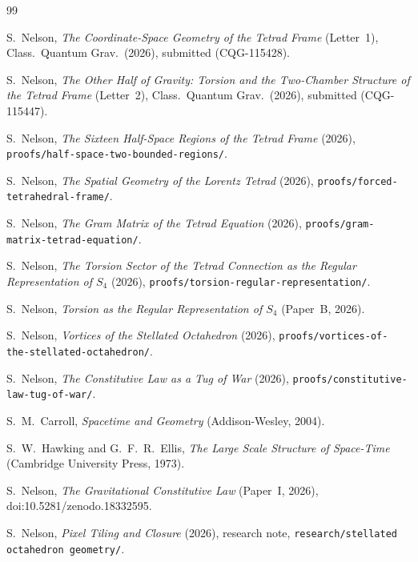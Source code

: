 \documentclass[twocolumn]{iopjournal}
\begin{document}
{\small
\begin{thebibliography}{99}

S.~Nelson, \textit{The Coordinate-Space Geometry of the Tetrad Frame}
(Letter~1), Class.\ Quantum Grav.\ (2026), submitted (CQG-115428).

S.~Nelson, \textit{The Other Half of Gravity: Torsion and the
Two-Chamber Structure of the Tetrad Frame} (Letter~2), Class.\
Quantum Grav.\ (2026), submitted (CQG-115447).

S.~Nelson, \textit{The Sixteen Half-Space Regions of the Tetrad Frame}
(2026), \texttt{proofs/half-space-two-bounded-regions/}.

S.~Nelson, \textit{The Spatial Geometry of the Lorentz Tetrad} (2026),
\texttt{proofs/forced-tetrahedral-frame/}.

S.~Nelson, \textit{The Gram Matrix of the Tetrad Equation} (2026),
\texttt{proofs/gram-matrix-tetrad-equation/}.

S.~Nelson, \textit{The Torsion Sector of the Tetrad Connection as the
Regular Representation of $S_4$} (2026),
\texttt{proofs/torsion-regular-representation/}.

S.~Nelson, \textit{Torsion as the Regular Representation of $S_4$}
(Paper~B, 2026).

S.~Nelson, \textit{Vortices of the Stellated Octahedron} (2026),
\texttt{proofs/vortices-of-the-}\allowbreak\texttt{stellated-octahedron/}.

S.~Nelson, \textit{The Constitutive Law as a Tug of War} (2026),
\texttt{proofs/constitutive-law-tug-of-war/}.

S.~M.~Carroll, \textit{Spacetime and Geometry} (Addison-Wesley, 2004).

S.~W.~Hawking and G.~F.~R.~Ellis, \textit{The Large Scale Structure of
Space-Time} (Cambridge University Press, 1973).

S.~Nelson, \textit{The Gravitational Constitutive Law} (Paper~I, 2026),
doi:10.5281/zenodo.18332595.

S.~Nelson, \textit{Pixel Tiling and Closure} (2026), research note,
\texttt{research/stellated octahedron geometry/}.

\end{thebibliography}
}
\end{document}
